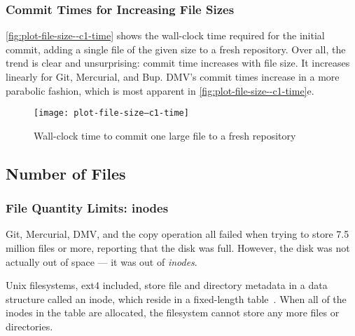 %

\subsubsection{Commit Times for Increasing File Sizes}


\autoref{fig:plot-file-size--c1-time} shows the wall-clock time required for the initial \gls{commit}, adding a single file of the given size to a fresh \gls{repository}.
Over all, the trend is clear and unsurprising: \gls{commit} time increases with file size.
It increases linearly for Git, Mercurial, and Bup.
DMV's commit times increase in a more parabolic fashion, which is most apparent in \autoref{fig:plot-file-size--c1-time}e.

\begin{figure}[p]
    \caption{Wall-clock time to commit one large file to a fresh repository}
    \label{fig:plot-file-size--c1-time}
    \centering

    \explainlogsubfig

    \texttt{[image: plot-file-size--c1-time]}
\end{figure}

%



\subsection{Number of Files}

\subsubsection{File Quantity Limits: inodes}


Git, Mercurial, DMV, and the copy operation all failed when trying to store \num{7.5} million files or more, reporting that the disk was full.
However, the disk was not actually out of space --- it was out of \emph{\glspl{inode}}.


Unix filesystems, ext4 included, store file and directory metadata in a data structure called an \gls{inode}, which reside in a fixed-length table~\cite{unix_timesharing_system}.
When all of the \glspl{inode} in the table are allocated, the filesystem cannot store any more files or directories.

